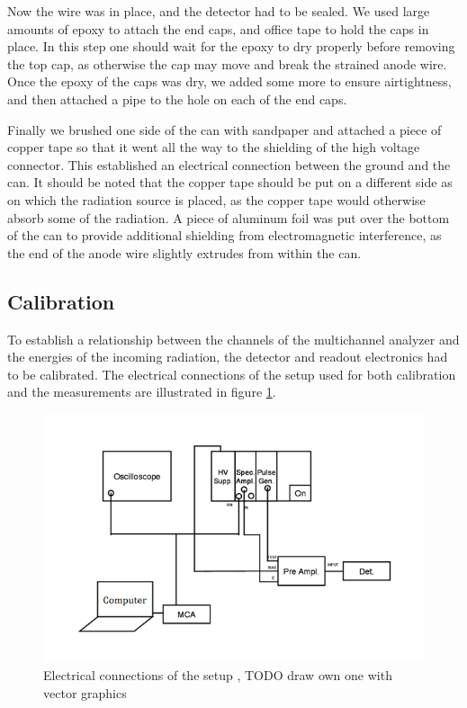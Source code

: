 \documentclass[a4paper]{article}
\begin{document}
Now the wire was in place, and the detector had to be sealed.
We used large amounts of epoxy to attach the end caps, and office tape to hold the caps in place.
In this step one should wait for the epoxy to dry properly before removing the top cap, as otherwise the cap may move and break the strained anode wire.
Once the epoxy of the caps was dry, we added some more to ensure airtightness, and then attached a pipe to the hole on each of the end caps.

Finally we brushed one side of the can with sandpaper and attached a piece of copper tape so that it went all the way to the shielding of the high voltage connector.
This established an electrical connection between the ground and the can.
It should be noted that the copper tape should be put on a different side as on which the radiation source is placed, as the copper tape would otherwise absorb some of the radiation.
A piece of aluminum foil was put over the bottom of the can to provide additional shielding from electromagnetic interference, as the end of the anode wire slightly extrudes from within the can.


\FloatBarrier
\subsection{Calibration}
\label{setup_calibration}
To establish a relationship between the channels of the multichannel analyzer and the energies of the incoming radiation, the detector and readout electronics had to be calibrated.
The electrical connections of the setup used for both calibration and the measurements are illustrated in figure \ref{fig:connections}.

\begin{figure}[ht!]
\centering
\includegraphics[width=\textwidth]{fig/instructions/connections.png}
\caption{Electrical connections of the setup \cite{instructions}, TODO draw own one with vector graphics}
\label{fig:connections}
\end{figure}
\end{document}
